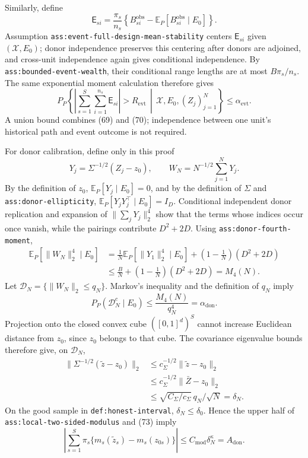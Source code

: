 Similarly, define
\[
\mathsf E_{si}=\frac{\pi_s}{n_s}
\left\{B_{si}^{\mathrm{obs}}
-\mathbb E_P[B_{si}^{\mathrm{obs}}\mid E_0]\right\}.
\]
Assumption \texttt{ass:event-full-design-mean-stability} centers
\(\mathsf E_{si}\) given \((\mathscr X,E_0)\); donor independence preserves
this centering after donors are adjoined, and cross-unit independence again
gives conditional independence.  By \texttt{ass:bounded-event-wealth}, their
conditional range lengths are at most \(B\pi_s/n_s\).  The same exponential
moment calculation therefore gives
\[
P_P\!\left\{
\left|\sum_{s=1}^{S}\sum_{i=1}^{n_s}\mathsf E_{si}\right|
>R_{\mathrm{evt}}
\,\middle|\,\mathscr X,E_0,(Z_j)_{j=1}^{N}
\right\}
\le\alpha_{\mathrm{evt}}.
\tag{70}
\]
A union bound combines (69) and (70); independence between one unit's
historical path and event outcome is not required.

For donor calibration, define only in this proof
\[
Y_j=\Sigma^{-1/2}(Z_j-z_0),
\qquad
W_N=N^{-1/2}\sum_{j=1}^{N}Y_j.
\]
By the definition of \(z_0\), \(\mathbb E_P[Y_j\mid E_0]=0\), and by the
definition of \(\Sigma\) and \texttt{ass:donor-ellipticity},
\(\mathbb E_P[Y_jY_j^\top\mid E_0]=I_D\).  Conditional independent donor
replication and expansion of \(\|\sum_jY_j\|_2^4\) show that the terms whose
indices occur once vanish, while the pairings contribute
\(D^2+2D\).  Using \texttt{ass:donor-fourth-moment},
\[
\begin{aligned}
\mathbb E_P[\|W_N\|_2^4\mid E_0]
&=\frac1N\mathbb E_P[\|Y_1\|_2^4\mid E_0]
+\left(1-\frac1N\right)(D^2+2D)\\
&\le \frac BN+\left(1-\frac1N\right)(D^2+2D)
=M_4(N).
\end{aligned}
\tag{71}
\]
Let \(\mathcal D_N=\{\|W_N\|_2\le q_N\}\).  Markov's inequality and the
definition of \(q_N\) imply
\[
P_P(\mathcal D_N^c\mid E_0)
\le \frac{M_4(N)}{q_N^4}=\alpha_{\mathrm{don}}.
\tag{72}
\]
Projection onto the closed convex cube \(([0,1]^d)^S\) cannot increase
Euclidean distance from \(z_0\), since \(z_0\) belongs to that cube.  The
covariance eigenvalue bounds therefore give, on \(\mathcal D_N\),
\[
\begin{aligned}
\|\Sigma^{-1/2}(\widetilde z-z_0)\|_2
&\le c_\Sigma^{-1/2}\|\widetilde z-z_0\|_2\\
&\le c_\Sigma^{-1/2}\|\bar Z-z_0\|_2\\
&\le \sqrt{C_\Sigma/c_\Sigma}\,q_N/\sqrt N
=\delta_N.
\end{aligned}
\tag{73}
\]
On the good sample in \texttt{def:honest-interval},
\(\delta_N\le\delta_0\).  Hence the upper half of
\texttt{ass:local-two-sided-modulus} and (73) imply
\[
\left|
\sum_{s=1}^{S}\pi_s
\{m_s(\widetilde z_s)-m_s(z_{0s})\}
\right|
\le C_{\mathrm{mod}}\delta_N^\kappa=A_{\mathrm{don}}.
\tag{74}
\]

